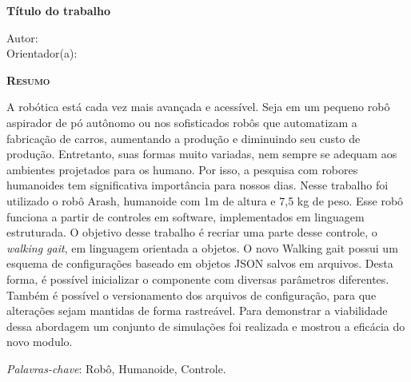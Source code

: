 \begin{center}
	{\Large{\textbf{Título do trabalho}}}
\end{center}

\vspace{1cm}

\begin{flushright}
	Autor: \writeauthor \\
	Orientador(a): \writeteacher
\end{flushright}

\vspace{1cm}

\begin{center}
	\Large{\textsc{\textbf{Resumo}}}
\end{center}

\noindent A robótica está cada vez mais avançada e acessível. Seja em um pequeno robô
aspirador de pó autônomo ou nos sofisticados robôs que automatizam a fabricação
de carros, aumentando a produção e diminuindo seu custo de produção. Entretanto,
suas formas muito variadas, nem sempre se adequam aos ambientes projetados para
os humano. Por isso, a pesquisa com robores humanoides tem significativa
importância para nossos dias. Nesse trabalho foi utilizado o robô Arash, humanoide
com 1m de altura e 7,5 kg de peso. Esse robô funciona a partir de controles em
software, implementados em linguagem estruturada. O objetivo desse trabalho é
recriar uma parte desse controle, o \textit{walking gait}, em linguagem orientada a objetos. O
novo Walking gait possui um esquema de configurações baseado em objetos JSON
salvos em arquivos. Desta forma, é possível inicializar o componente com diversas
parâmetros diferentes. Também é possível o versionamento dos arquivos de
configuração, para que alterações sejam mantidas de forma rastreável. Para
demonstrar a viabilidade dessa abordagem um conjunto de simulações foi realizada
e mostrou a eficácia do novo modulo.

\noindent\textit{Palavras-chave}: Robô, Humanoide, Controle.
